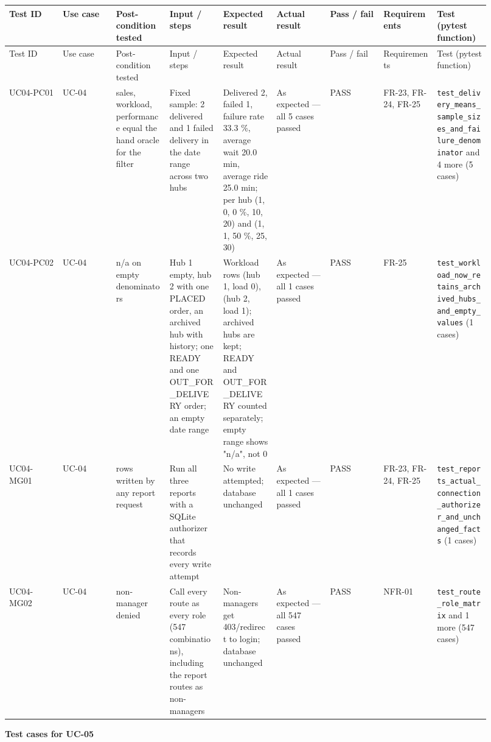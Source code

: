 \begin{landscape}
\begingroup\footnotesize
\begin{longtable}{>{\raggedright\arraybackslash}p{0.1022\linewidth}>{\raggedright\arraybackslash}p{0.1022\linewidth}>{\raggedright\arraybackslash}p{0.1022\linewidth}>{\raggedright\arraybackslash}p{0.1022\linewidth}>{\raggedright\arraybackslash}p{0.1022\linewidth}>{\raggedright\arraybackslash}p{0.1022\linewidth}>{\raggedright\arraybackslash}p{0.1022\linewidth}>{\raggedright\arraybackslash}p{0.1022\linewidth}>{\raggedright\arraybackslash}p{0.1022\linewidth}}
Test ID & Use case & Post-condition tested & Input / steps & Expected result & Actual result & Pass / fail & Requirements & Test (pytest function) \\
\hline\endfirsthead
Test ID & Use case & Post-condition tested & Input / steps & Expected result & Actual result & Pass / fail & Requirements & Test (pytest function) \\
\hline\endhead
UC04-PC01 & UC-04 & sales, workload, performance equal the hand oracle for the filter & Fixed sample: 2 delivered and 1 failed delivery in the date range across two hubs & Delivered 2, failed 1, failure rate 33.3 \%, average wait 20.0 min, average ride 25.0 min; per hub (1, 0, 0 \%, 10, 20) and (1, 1, 50 \%, 25, 30) & As expected --- all 5 cases passed & PASS & FR-23, FR-24, FR-25 & \texttt{test\_\allowbreak{}delivery\_\allowbreak{}means\_\allowbreak{}sample\_\allowbreak{}sizes\_\allowbreak{}and\_\allowbreak{}failure\_\allowbreak{}denominator} and 4 more (5 cases) \\
UC04-PC02 & UC-04 & n/a on empty denominators & Hub 1 empty, hub 2 with one PLACED order, an archived hub with history; one READY and one OUT\_FOR\_DELIVERY order; an empty date range & Workload rows (hub 1, load 0), (hub 2, load 1); archived hubs are kept; READY and OUT\_FOR\_DELIVERY counted separately; empty range shows "n/a", not 0 & As expected --- all 1 cases passed & PASS & FR-25 & \texttt{test\_\allowbreak{}workload\_\allowbreak{}now\_\allowbreak{}retains\_\allowbreak{}archived\_\allowbreak{}hubs\_\allowbreak{}and\_\allowbreak{}empty\_\allowbreak{}values} (1 cases) \\
UC04-MG01 & UC-04 & 0 rows written by any report request & Run all three reports with a SQLite authorizer that records every write attempt & No write attempted; database unchanged & As expected --- all 1 cases passed & PASS & FR-23, FR-24, FR-25 & \texttt{test\_\allowbreak{}reports\_\allowbreak{}actual\_\allowbreak{}connection\_\allowbreak{}authorizer\_\allowbreak{}and\_\allowbreak{}unchanged\_\allowbreak{}facts} (1 cases) \\
UC04-MG02 & UC-04 & non-manager denied & Call every route as every role (547 combinations), including the report routes as non-managers & Non-managers get 403/redirect to login; database unchanged & As expected --- all 547 cases passed & PASS & NFR-01 & \texttt{test\_\allowbreak{}route\_\allowbreak{}role\_\allowbreak{}matrix} and 1 more (547 cases) \\
\end{longtable}
\endgroup
\end{landscape}
\textbf{Test cases for UC-05}

